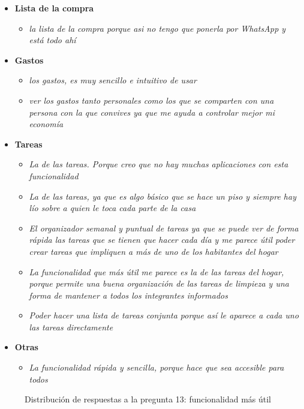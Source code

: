 \begin{itemize}
    \item \textbf{Lista de la compra}
    \begin{itemize}
        \item \textit{la lista de la compra porque asi no tengo que ponerla por WhatsApp y está todo ahí }
    \end{itemize}
    \item \textbf{Gastos}
    \begin{itemize}
        \item \textit{los gastos, es muy sencillo e intuitivo de usar}
        \item \textit{ver los gastos tanto personales como los que se comparten con una persona con la que convives ya que me ayuda a controlar mejor mi economía} 
    \end{itemize}
    \item \textbf{Tareas}
    \begin{itemize}
        \item \textit{La de las tareas. Porque creo que no hay muchas aplicaciones con esta funcionalidad}
        \item \textit{La de las tareas, ya que es algo básico que se hace un piso y siempre hay lío sobre a quien le toca cada parte de la casa}
        \item \textit{El organizador semanal y puntual de tareas ya que se puede ver de forma rápida las tareas que se tienen que hacer cada día y me parece útil poder crear tareas que impliquen a más de uno de los habitantes del hogar}
        \item \textit{La funcionalidad que más útil me parece es la de las tareas del hogar, porque permite una buena organización de las tareas de limpieza y una forma de mantener a todos los integrantes informados}
        \item \textit{Poder hacer una lista de tareas conjunta porque así le aparece a cada uno las tareas directamente}   
    \end{itemize}
    \item \textbf{Otras}
    \begin{itemize}
        \item \textit{La funcionalidad rápida y sencilla, porque hace que sea accesible para todos}
    \end{itemize}
\end{itemize}

\begin{figure}[H]
    \centering
    \caption{Distribución de respuestas a la pregunta 13: funcionalidad más útil}
    \label{fig:funcionalidad-util}
\end{figure}

